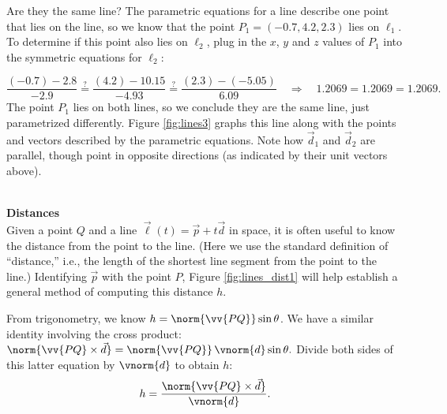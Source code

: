 {Are they the same line? The parametric equations for a line describe one point that lies on the line, so we know that the point $P_1 = (-0.7,4.2,2.3)$ lies on $\ell_1$. To determine if this point also lies on $\ell_2$, plug in the $x$, $y$ and $z$ values of $P_1$ into the symmetric equations for $\ell_2$:

\small
$$\frac{(-0.7)-2.8}{-2.9} \stackrel{?}{=} \frac{(4.2)-10.15}{-4.93} \stackrel{?}{=} \frac{(2.3)-(-5.05)}{6.09} \quad \Rightarrow \quad 1.2069=1.2069=1.2069.$$
\normalsize
{}
The point $P_1$ lies on both lines, so we conclude they are the same line, just parametrized differently. Figure \ref{fig:lines3} graphs this line along with the points and vectors described by the parametric equations. Note how $\vec d_1$ and $\vec d_2$ are parallel, though point in opposite directions (as indicated by their unit vectors above). 
}\\

\noindent\textbf{\large Distances}\\

Given a point $Q$ and a line $\vec\ell(t) = \vec p+t\vec d$ in space, it is often useful to know the distance from the point to the line. (Here we use the standard definition of ``distance,'' i.e., the length of the shortest line segment from the point to the line.) Identifying $\vec p$ with the point $P$, Figure \ref{fig:lines_dist1} will help establish a general method of computing this distance $h$.

From trigonometry, we know $h = \norm{\vv{PQ}}\sin\theta$. We have a similar identity involving the cross product: $\norm{\vv{PQ}\times \vec d} = \norm{\vv{PQ}}\, \vnorm{d}\sin\theta.$ Divide both sides of this latter equation by $\vnorm{d}$ to obtain $h$:
\begin{equation}
h = \frac{\norm{\vv{PQ}\times \vec d}}{\vnorm{d}}.
\label{eq:lines2}
\end{equation}

